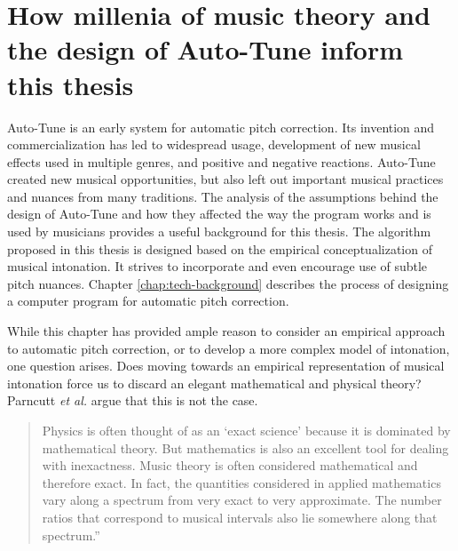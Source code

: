 \section{How millenia of music theory and the design of Auto-Tune inform this thesis}
Auto-Tune is an early system for automatic pitch correction. Its invention and commercialization has led to widespread usage, development of new musical effects used in multiple genres, and positive and negative reactions. Auto-Tune created new musical opportunities, but also left out important musical practices and nuances from many traditions. The analysis of the assumptions behind the design of Auto-Tune and how they affected the way the program works and is used by musicians provides a useful background for this thesis. The algorithm proposed in this thesis is designed based on the empirical conceptualization of musical intonation. It strives to incorporate and even encourage use of subtle pitch nuances. Chapter \ref{chap:tech-background} describes the process of designing a computer program for automatic pitch correction.

While this chapter has provided ample reason to consider an empirical approach to automatic pitch correction, or to develop a more complex model of intonation, one question arises. Does moving towards an empirical representation of musical intonation force us to discard an elegant mathematical and physical theory? Parncutt \textit{et al.} argue that this is not the case. 
\begin{quotation}Physics is often thought of as an `exact science' because it is dominated by mathematical theory. But mathematics is also an excellent tool for dealing with inexactness. Music theory is often considered mathematical and therefore exact. In fact, the quantities considered in applied mathematics vary along a spectrum from very exact to very approximate. The number ratios that correspond to musical intervals also lie somewhere along that spectrum.''
\end{quotation}



